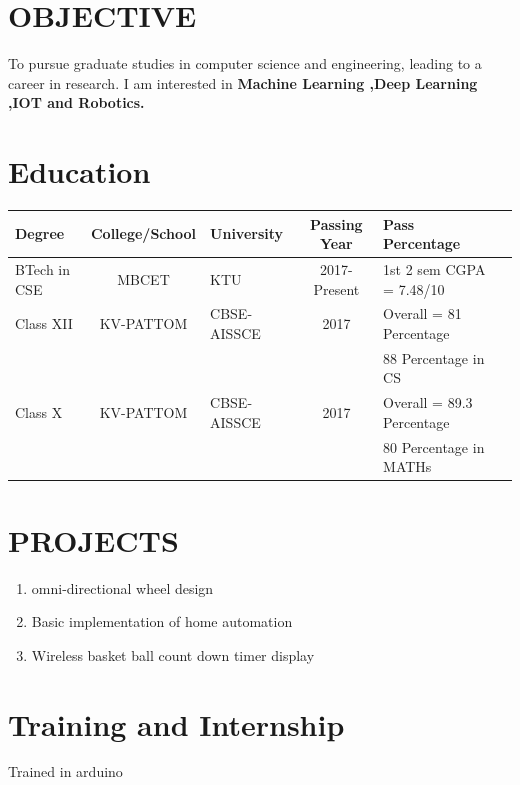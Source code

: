 \documentclass[margin,line]{res}
\begin{document}
\begin{resume}
\begin{tabular}{@{}p{3.5in}p{3in}}
		\end{tabular}
		
		\vspace{.1in}
	\section{\sc OBJECTIVE}

To pursue graduate studies in computer science and engineering, leading to a career in research. I am interested in \bf Machine Learning ,Deep Learning ,IOT and Robotics. 

\vspace{.1in}
\section{\sc Education}
\begin{tabular}{|l|c|l|c|l|c|}\hline
	\bf Degree&\bf College/School&\bf University&\bf Passing Year&\bf Pass Percentage \\ \hline
	BTech in CSE
	&MBCET & KTU & 2017-Present&1st 2 sem CGPA = 7.48/10 \\ \hline
	Class XII
	&KV-PATTOM & CBSE-AISSCE  & 2017& Overall = 81 Percentage \\&&&&88 Percentage in CS 
	
	\\ \hline
	Class X
	&KV-PATTOM & CBSE-AISSCE  & 2017& Overall = 89.3 Percentage \\&&&&80 Percentage in MATHs 
	
	\\ \hline
\end{tabular}	
\section{\sc PROJECTS}

\begin{enumerate} %
	\item omni-directional wheel design \\
	\item Basic implementation of home automation\\
	\item Wireless basket ball count down timer display\\
\end{enumerate}

\section{\sc Training and Internship}
Trained in arduino \\

\end{resume}
\end{document}
